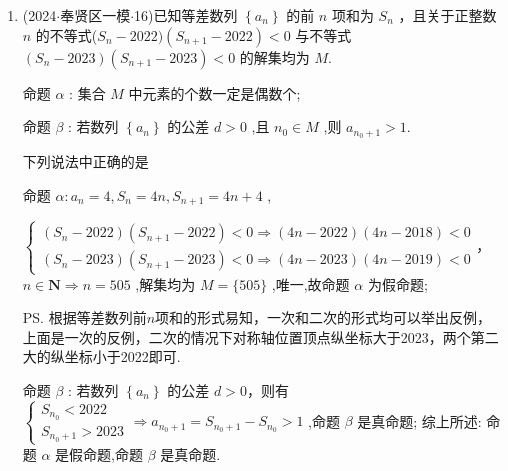 \begin{enumerate}
\begin{jieda}
        根据等比数列前$n$项和的形式可知$q = -1$可以满足要求，故根据前两项有$\left\{\begin{array}{l}
            2\sqrt{a_1} = a_1+c \\
            0 = -a_1+c
        \end{array}\right.$，解得$\left\{\begin{array}{l}
            a_1 = 1 \\
            c = 1
        \end{array}\right.$，经检验$a_n = (-1)^{n-1}$满足要求，所以$\left\{  {a}_{n}\right\}$ 具有性质 $p$ ,这表明存在等比数列 $\left\{  {a}_{n}\right\}$ 具有性质 $p$ . 综上,   真、  假. 故选: B.
    \end{jieda}
    \item (2024$\cdot$奉贤区一模$\cdot$16)已知等差数列 $\left\{  {a}_{n}\right\}$ 的前 $n$ 项和为 ${S}_{n}$ ，且关于正整数 $n$ 的不等式($S_n - {2022})\left( {{S}_{n + 1} - {2022}}\right)  < 0$ 与不等式 $\left( {{S}_{n} - {2023}}\right) \left( {{S}_{n + 1} - {2023}}\right)  < 0$ 的解集均为 $M$.

    命题 $\alpha$ : 集合 $M$ 中元素的个数一定是偶数个;

    命题 $\beta$ : 若数列 $\left\{  {a}_{n}\right\}$ 的公差 $d > 0$ ,且 ${n}_{0} \in  M$ ,则 ${a}_{{n}_{0} + 1} > 1$.

    下列说法中正确的是 

    \begin{jieda}
        命题 $\alpha  : {a}_{n} = 4,{S}_{n} = {4n},{S}_{n + 1} = {4n} + 4$ ,

        $\left\{  \begin{array}{l} \left( {{S}_{n} - {2022}}\right) \left( {{S}_{n + 1} - {2022}}\right)  < 0 \Longrightarrow  \left( {{4n} - {2022}}\right) \left( {{4n} - {2018}}\right)  < 0 \\  \left( {{S}_{n} - {2023}}\right) \left( {{S}_{n + 1} - {2023}}\right)  < 0 \Longrightarrow  \left( {{4n} - {2023}}\right) \left( {{4n} - {2019}}\right)  < 0 \end{array}\right.$，$n \in  \mathbf{N} \Longrightarrow  n = {505}$ ,解集均为 $M = \{ {505}\}$ ,唯一,故命题 $\alpha$ 为假命题; 

        \ps 根据等差数列前$n$项和的形式易知，一次和二次的形式均可以举出反例，上面是一次的反例，二次的情况下对称轴位置顶点纵坐标大于2023，两个第二大的纵坐标小于2022即可.
        
        命题 $\beta$ : 若数列 $\left\{  {a}_{n}\right\}$ 的公差 $d > 0$，则有$\left\{  {\begin{array}{l} {S}_{{n}_{0}} < {2022} \\  {S}_{{n}_{0} + 1} > {2023} \end{array} \Longrightarrow  {a}_{{n}_{0} + 1} = }\right. {S}_{{n}_{0} + 1} - {S}_{{n}_{0}} > 1$ ,命题 $\beta$ 是真命题; 综上所述: 命题 $\alpha$ 是假命题,命题 $\beta$ 是真命题.
    \end{jieda}
\end{enumerate}
